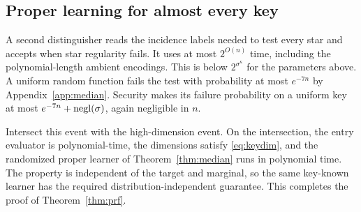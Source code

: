 \subsection{Proper learning for almost every key}
A second distinguisher reads the incidence labels needed to test every star and accepts when star regularity fails. It uses at most $2^{O(n)}$ time, including the polynomial-length ambient encodings. This is below $2^{\sigma^\kappa}$ for the parameters above. A uniform random function fails the test with probability at most $e^{-7n}$ by Appendix~\ref{app:median}. Security makes its failure probability on a uniform key at most $e^{-7n}+\operatorname{negl}(\sigma)$, again negligible in $n$.

Intersect this event with the high-dimension event. On the intersection, the entry evaluator is polynomial-time, the dimensions satisfy \eqref{eq:keydim}, and the randomized proper learner of Theorem~\ref{thm:median} runs in polynomial time. The property is independent of the target and marginal, so the same key-known learner has the required distribution-independent guarantee. This completes the proof of Theorem~\ref{thm:prf}.
